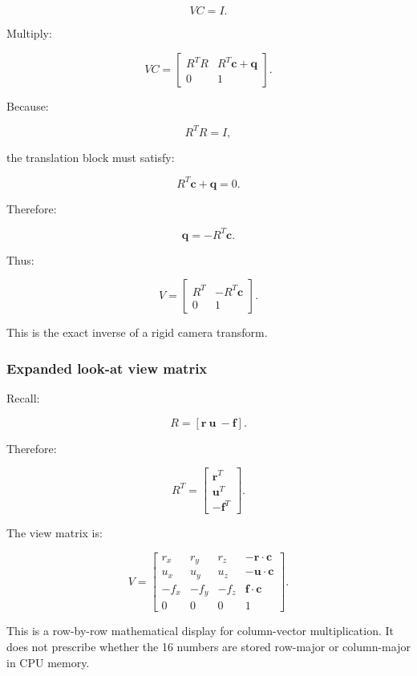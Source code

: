 \[
 VC=I.
\]

Multiply:

\[
 VC= \begin{bmatrix} R^TR&R^T\mathbf c+\mathbf q\\ 0&1 \end{bmatrix}.
\]

Because:

\[
 R^TR=I,
\]

the translation block must satisfy:

\[
 R^T\mathbf c+\mathbf q=0.
\]

Therefore:

\[
 \mathbf q=-R^T\mathbf c.
\]

Thus:

\[
 \boxed{ V= \begin{bmatrix} R^T&-R^T\mathbf c\\ 0&1 \end{bmatrix} }.
\]

This is the exact inverse of a rigid camera transform.

\subsubsection{Expanded look-at view matrix}\label{02-foundations-ii-ch032-expanded-look-at-view-matrix}

\hypertarget{02-foundations-ii-ch032-expanded-look-at-view-matrix}{}

Recall:

\[
 R=[\mathbf r\ \mathbf u\ -\mathbf f].
\]

Therefore:

\[
 R^T= \begin{bmatrix} \mathbf r^T\\ \mathbf u^T\\ -\mathbf f^T \end{bmatrix}.
\]

The view matrix is:

\[
 \boxed{ V= \begin{bmatrix} r_x&r_y&r_z&-\mathbf r\cdot\mathbf c\\ u_x&u_y&u_z&-\mathbf u\cdot\mathbf c\\ -f_x&-f_y&-f_z&\mathbf f\cdot\mathbf c\\ 0&0&0&1 \end{bmatrix} }.
\]

This is a row-by-row mathematical display for column-vector multiplication. It does not prescribe whether the 16 numbers are stored row-major or column-major in CPU memory.

